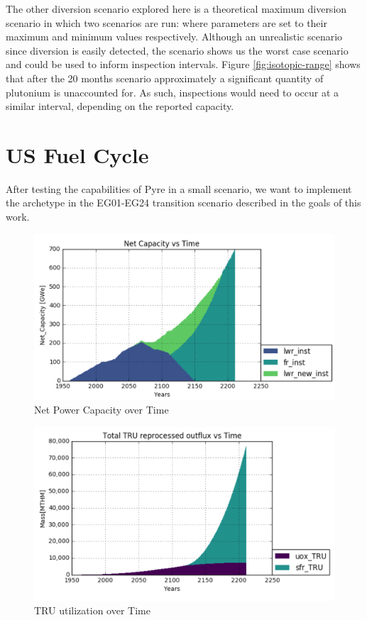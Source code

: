 The other diversion scenario explored here is a theoretical maximum diversion scenario in which two scenarios are run: where parameters are set to their maximum and minimum values
respectively. Although an unrealistic scenario since diversion is easily detected, the scenario shows us the worst case scenario and could be used to inform inspection intervals.
Figure \ref{fig:isotopic-range} shows that after the 20 months scenario approximately a significant quantity of plutonium is unaccounted for. As such, inspections would need to occur
at a similar interval, depending on the reported capacity.

\section{US Fuel Cycle}

After testing the capabilities of Pyre in a small scenario, we want to implement the archetype in the EG01-EG24 transition scenario described in the goals of this work.
\begin{figure} [h]
	\centering
	\includegraphics[width=\linewidth]{images/transition-netcap}
	\caption{Net Power Capacity over Time}
	\label{fig:net-cap}
\end{figure}

\begin{figure} [h]
	\centering
	\includegraphics[width=\linewidth]{images/transition-TRUutil}
	\caption{TRU utilization over Time}
	\label{fig:TRU-util}
\end{figure}

